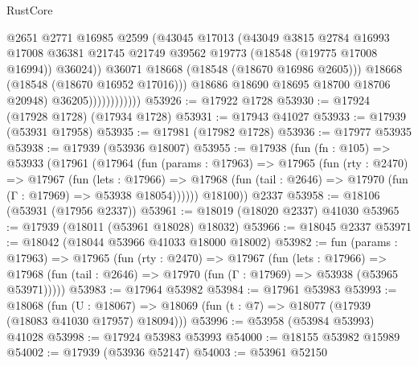 \begin{lexlean}{RustCore}
\begin{coremodule}
                                  @2651
                                  @2771
                                  @16985
                                  @2599
                                  (@43045
                                    @17013
                                    (@43049
                                      @3815
                                      @2784
                                      @16993
                                      @17008
                                      @36381
                                      @21745
                                      @21749
                                      @39562
                                      @19773
                                      (@18548 (@19775 @17008 @16994))
                                      @36024))
                                  @36071
                                  @18668
                                  (@18548 (@18670 @16986 @2605)))
                                @18668
                                (@18548 (@18670 @16952 @17016)))
                              @18686
                              @18690
                              @18695
                              @18700
                              @18706
                              @20948)
                            @36205))))))))))))
@53926 := @17922 @1728
@53930 := @17924 (@17928 @1728) (@17934 @1728)
@53931 := @17943 @41027
@53933 := @17939 (@53931 @17958)
@53935 := @17981 (@17982 @1728)
@53936 := @17977 @53935
@53938 := @17939 (@53936 @18007)
@53955 := @17938
    (fun (fn : @105) =>
    @53933
      (@17961
        (@17964
          (fun (params : @17963) =>
          @17965
            (fun (rty : @2470) =>
            @17967
              (fun (lets : @17966) =>
              @17968 (fun (tail : @2646) => @17970 (fun (Γ : @17969) => @53938 @18054))))))
        @18100))
    @2337
@53958 := @18106 (@53931 (@17956 @2337))
@53961 := @18019 (@18020 @2337) @41030
@53965 := @17939 (@18011 (@53961 @18028) @18032)
@53966 := @18045 @2337
@53971 := @18042 (@18044 @53966 @41033 @18000 @18002)
@53982 := fun (params : @17963) =>
  @17965
    (fun (rty : @2470) =>
    @17967
      (fun (lets : @17966) =>
      @17968 (fun (tail : @2646) => @17970 (fun (Γ : @17969) => @53938 (@53965 @53971)))))
@53983 := @17964 @53982
@53984 := @17961 @53983
@53993 := @18068
    (fun (U : @18067) => @18069 (fun (t : @7) => @18077 (@17939 (@18083 @41030 @17957) @18094)))
@53996 := @53958 (@53984 @53993) @41028
@53998 := @17924 @53983 @53993
@54000 := @18155 @53982 @15989
@54002 := @17939 (@53936 @52147)
@54003 := @53961 @52150

\end{coremodule}
\end{lexlean}
